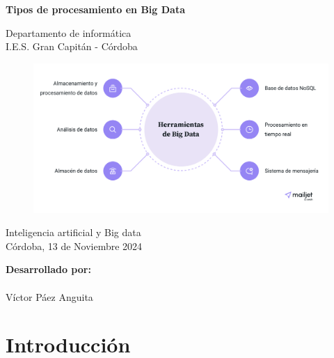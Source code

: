 \documentclass[12pt]{article}
\begin{document}
\begin{titlepage}
    \begin{center}
      \Large \bfseries{}
    \end{center}
    \vspace{0.1cm}
    \begin{center}
      \Large \bfseries{}
    \end{center}
    \vspace{0.1cm}
    \begin{center}
     \Large \bfseries{Tipos de procesamiento en Big Data}
    \end{center}
    \vspace{0.0001cm}
    \begin{center}
        Departamento de informática \\ I.E.S. Gran Capitán - Córdoba
    \end{center}
        \vspace{2 cm}
\begin{figure}[h!]
    \centering
    \includegraphics[width=.6\textwidth]{Portada.png}
    \label{fig:my_label}
\end{figure}
    \vspace{0.2 cm}
    \begin{center}
        Inteligencia artificial y Big data \\ Córdoba, 13 de Noviembre 2024
    \end{center}
    \vspace{4 cm}
\null\hfill \textbf{Desarrollado por:}
\\
\\
\null\hfill Víctor Páez Anguita
\clearpage
\end{titlepage}

\tableofcontents
\clearpage

\section{Introducción}
\end{document}
